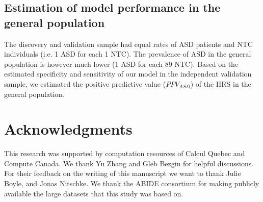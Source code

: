 \documentclass[9pt,lineno]{elife}
\begin{document}
\subsection{Estimation of model performance in the general population}
The discovery and validation sample had equal rates of ASD patients and NTC individuals (i.e. 1 ASD for each 1 NTC). The prevalence of ASD in the general population is however much lower (1 ASD for each 89 NTC). Based on the estimated specificity and sensitivity of our model in the independent validation sample, we estimated the positive predictive value ($PPV_{ASD}$) of the HRS in the general population.

\section{Acknowledgments}

This research was supported by computation resources of Calcul Quebec and Compute Canada. We thank Yu Zhang and Gleb Bezgin for helpful discussions. For their feedback on the writing of this manuscript we want to thank Julie Boyle, and Jonas Nitschke. We thank the ABIDE consortium for making publicly available the large datasets that this study was based on.



\end{document}
